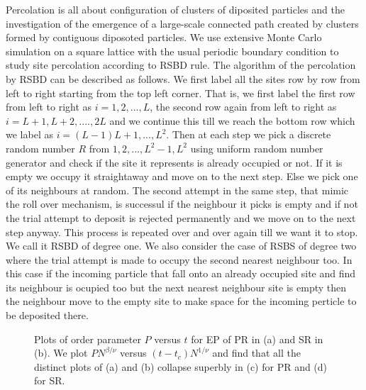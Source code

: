 \documentclass[twocolumn,showpacs,preprintnumbers,amsmath,amssymb]{article}
\begin{document}
Percolation is all about configuration of clusters of diposited particles and the investigation of the emergence 
of a large-scale connected path created by clusters formed by contiguous diposoted particles.
We use extensive Monte Carlo simulation on a square lattice with the usual periodic boundary condition
to study site percolation according to RSBD rule.
The algorithm of the percolation by RSBD can be described as follows. We first label all the sites
row by row from left to right starting from the top left corner. That is, we first label the first row from
left to right as $i=1,2,...,L$, the second row again from left to right as $i=L+1,L+2,....,2L$
and we continue this till we reach the bottom row which we label as $i=(L-1)L+1,...,L^2$. 
Then at each step we pick a discrete random number $R$ from $1,2,...,L^2-1,L^2$ using uniform random number
 generator and check if the site it represents is already occupied or not. If it is
empty we occupy it straightaway and move on to the next step. Else we pick one of its neighbours at random. 
The second attempt in the same step, that mimic the roll over mechanism, is successul if the neighbour
it picks is empty and if not the trial attempt to deposit is rejected permanently and we move on to the next 
step anyway. This process is
repeated over and over again till we want it to stop. We call it RSBD of degree one. We also consider
the case of RSBS of degree two where the trial attempt is made to occupy the second nearest neighbour too.
In this case if the incoming particle that fall onto an already occupied site and find its 
neighbour is ocupied too but the next nearest neighbour site is empty then the neighbour move to the empty
site to make space for the incoming perticle to be deposited there. 






\begin{figure}

\centering


\caption{Plots of order parameter $P$ versus $t$ for EP of PR in (a) and SR in (b). We plot $PN^{\beta/\nu}$ versus $(t-t_c)N^{1/\nu}$ and
find that all the distinct plots of (a) and (b) collapse superbly in (c) for PR and (d) for SR.
} 

\label{fig:1ab}

\end{figure}
\end{document}
